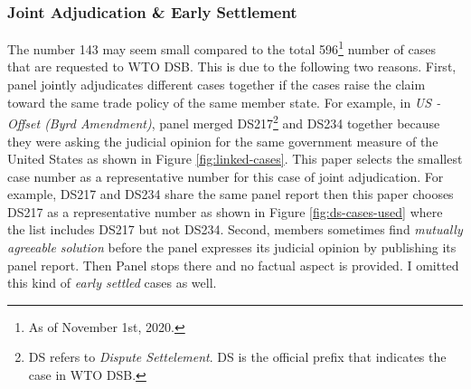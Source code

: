 \subsubsection{Joint Adjudication \& Early Settlement}
The number 143 may seem small compared to the total 596\footnote
{As of November 1st, 2020.} number of cases that are requested to WTO DSB. This is due to the following two reasons.
First, panel jointly adjudicates different cases together if the cases raise the claim toward the
same trade policy of the same member state. For example, in \textit{US - Offset (Byrd Amendment)}, panel merged DS217\footnote{
  DS refers to \textit{Dispute Settelement}. DS is the official prefix that indicates the case in WTO DSB.
} and DS234 together because they were asking the judicial opinion for the same government measure of the United States as shown in Figure \ref{fig:linked-cases}.
This paper selects the smallest case number as a representative number for this case of joint adjudication.
For example, DS217 and DS234 share the same panel report then this paper chooses DS217 as a representative number as shown in Figure \ref{fig:ds-cases-used} where the list includes DS217 but not DS234.
Second, members sometimes find \textit{mutually agreeable solution} before the panel expresses its judicial opinion by publishing its panel report. Then Panel stops there and no factual aspect is provided. I omitted this kind of \textit{early settled} cases as well.
